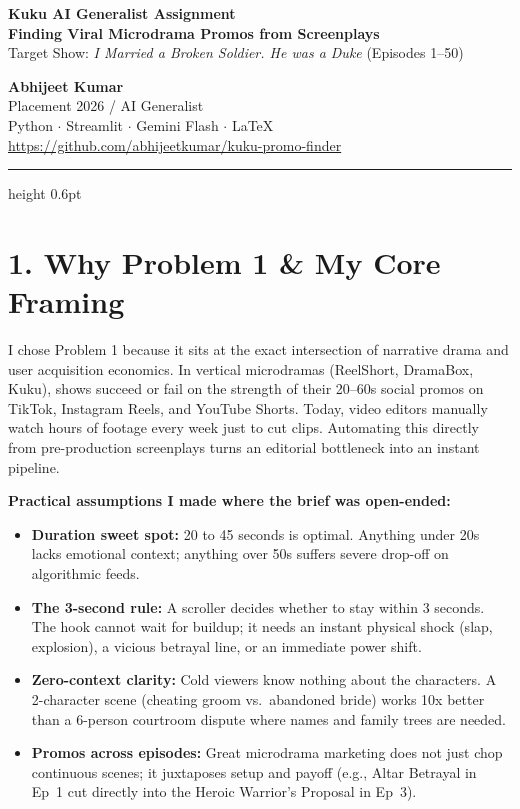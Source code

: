 \documentclass[9.5pt,a4paper]{article}
\begin{document}
\begin{minipage}[t]{0.68\textwidth}
    {\Large\bfseries\color{navyblue} Kuku AI Generalist Assignment} \\[1pt]
    {\normalsize\bfseries\color{darkslate} Finding Viral Microdrama Promos from Screenplays} \\[1pt]
    {\scriptsize\color{gray} Target Show: \textit{I Married a Broken Soldier. He was a Duke} (Episodes 1--50)}
\end{minipage}
\hfill
\begin{minipage}[t]{0.30\textwidth}
    \raggedleft
    {\footnotesize\bfseries Abhijeet Kumar} \\
    {\scriptsize Placement 2026 / AI Generalist} \\
    {\scriptsize Python $\cdot$ Streamlit $\cdot$ Gemini Flash $\cdot$ LaTeX} \\
    {\tiny\url{https://github.com/abhijeetkumar/kuku-promo-finder}}
\end{minipage}

\vspace{2pt}
\hrule height 0.6pt
\vspace{3pt}

\section{1. Why Problem 1 \& My Core Framing}
I chose Problem 1 because it sits at the exact intersection of narrative drama and user acquisition economics. In vertical microdramas (ReelShort, DramaBox, Kuku), shows succeed or fail on the strength of their 20--60s social promos on TikTok, Instagram Reels, and YouTube Shorts. Today, video editors manually watch hours of footage every week just to cut clips. Automating this directly from pre-production screenplays turns an editorial bottleneck into an instant pipeline.

\textbf{Practical assumptions I made where the brief was open-ended:}
\begin{itemize}
    \item \textbf{Duration sweet spot:} 20 to 45 seconds is optimal. Anything under 20s lacks emotional context; anything over 50s suffers severe drop-off on algorithmic feeds.
    \item \textbf{The 3-second rule:} A scroller decides whether to stay within 3 seconds. The hook cannot wait for buildup; it needs an instant physical shock (slap, explosion), a vicious betrayal line, or an immediate power shift.
    \item \textbf{Zero-context clarity:} Cold viewers know nothing about the characters. A 2-character scene (cheating groom vs.\ abandoned bride) works 10x better than a 6-person courtroom dispute where names and family trees are needed.
    \item \textbf{Promos across episodes:} Great microdrama marketing does not just chop continuous scenes; it juxtaposes setup and payoff (e.g., Altar Betrayal in Ep~1 cut directly into the Heroic Warrior's Proposal in Ep~3).
\end{itemize}
\end{document}
